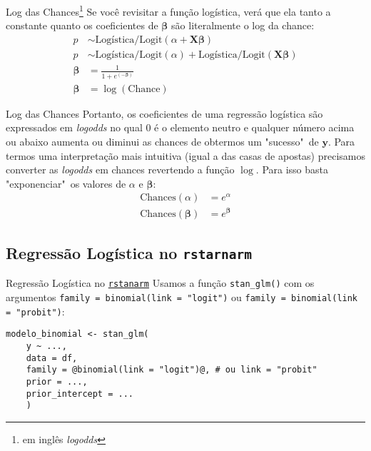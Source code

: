\begin{frame}{Log das Chances\footnote{em inglês \textit{logodds}}}
    Se você revisitar a função logística, verá que ela tanto a constante quanto
    os coeficientes de $\boldsymbol{\beta}$ são literalmente o log da
    chance:
    $$
    \begin{aligned}
        p &\sim \text{Logística/Logit}(\alpha +  \mathbf{X} \boldsymbol{\beta} ) \\
        p &\sim \text{Logística/Logit}(\alpha) + \text{Logística/Logit}( \mathbf{X} \boldsymbol{\beta}) \\
        \boldsymbol{\beta} &= \frac{1}{1 + e^{(-\boldsymbol{\beta})}}\\
        \boldsymbol{\beta} &= \log(\text{Chance})
    \end{aligned}
    $$
\end{frame}

\begin{frame}{Log das Chances}
    Portanto, os coeficientes de uma regressão logística são expressados em
    \textit{logodds} no qual $0$ é o elemento neutro e qualquer número acima ou
    abaixo aumenta ou diminui as chances de obtermos um "sucesso"~de
    $\boldsymbol{y}$. Para termos uma interpretação mais intuitiva
    (igual a das casas de apostas) precisamos converter as \textit{logodds}
    em chances revertendo a função $\log$. Para isso basta "exponenciar"~os
    valores de $\alpha$ e $\boldsymbol{\beta}$:
    $$
    \begin{aligned}
        \text{Chances}(\alpha) &= e^\alpha \\
        \text{Chances}({\boldsymbol{\beta}}) &= e^{\boldsymbol{\beta}}
    \end{aligned}
    $$
\end{frame}

\subsection{Regressão Logística no \texttt{rstarnarm}}
\begin{frame}[fragile]{Regressão Logística no \href{http://mc-stan.org/rstanarm/}{\texttt{rstanarm}}}
    Usamos a função \texttt{stan\_glm()} com os argumentos \texttt{family = binomial(link = "logit")} ou
    \texttt{family = binomial(link = "probit")}:
    \vfill
    \begin{lstlisting}[basicstyle=\small]
    modelo_binomial <- stan_glm(
    y ~ ...,
    data = df,
    family = @binomial(link = "logit")@, # ou link = "probit"
    prior = ...,
    prior_intercept = ...
    )
    \end{lstlisting}
\end{frame}

